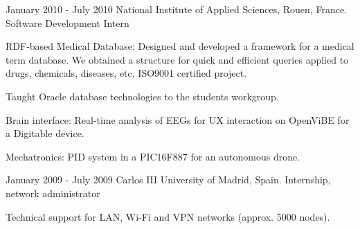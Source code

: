 \experience
  {January 2010 - July 2010}
  {National Institute of Applied Sciences, Rouen, France.}
  {Software Development Intern}
  {\vspace{-1em}\begin{rlist}
    \item RDF-based Medical Database: Designed and developed a framework for a medical
    term database. We obtained a structure for quick and efficient queries applied
    to drugs, chemicals, diseases, etc. ISO9001 certified project.
    \item Taught Oracle database technologies to the students workgroup.
    \item Brain interface: Real-time analysis of EEGs for UX interaction on OpenViBE for a Digitable device.
    \item Mechatronics: PID system in a PIC16F887 for an autonomous drone.
  \end{rlist}}

\experience
  {January 2009 - July 2009}
  {Carlos III University of Madrid, Spain.}
  {Internship, network administrator}
  {\vspace{-1em}\begin{rlist}
    \item Technical support for LAN, Wi-Fi and VPN networks (approx. 5000 nodes).
  \end{rlist}}
